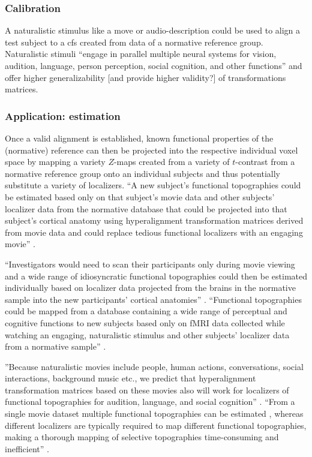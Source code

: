 \subsubsection{Calibration}
%
A naturalistic stimulus like a move or audio-description could be used to align
a test subject to a \ac{cfs} created from data of a normative reference group.
%
Naturalistic stimuli ``engage in parallel multiple neural systems for vision,
audition, language, person perception, social cognition, and other functions''
\citep{jiahui2020predicting} and offer higher generalizability [and provide
higher validity?] of transformations matrices.



\subsubsection{Application: estimation}

%
Once a valid alignment is established, known functional properties of the
(normative) reference can then be projected into the respective individual voxel
space by mapping a variety $Z$-maps created from a variety of $t$-contrast from
a normative reference group onto an individual subjects and thus potentially
substitute a variety of localizers.
%
``A new subject's functional topographies could be estimated based only on that
subject's movie data and other subjects' localizer data from the normative
database that could be projected into that subject's cortical anatomy using
hyperalignment transformation matrices derived from movie data and could replace
tedious functional localizers with an engaging movie''
\citep{jiahui2020predicting}.

%
``Investigators would need to scan their participants only during movie viewing
and a wide range of idiosyncratic functional topographies could then be
estimated individually based on localizer data projected from the brains in the
normative sample into the new participants' cortical anatomies''
\citep{jiahui2020predicting}.
%
``Functional topographies could be mapped from a database containing a wide
range of perceptual and cognitive functions to new subjects based only on fMRI
data collected while watching an engaging, naturalistic stimulus and other
subjects' localizer data from a normative sample'' \citep{jiahui2020predicting}.

%
''Because naturalistic movies include people, human actions, conversations,
social interactions, background music etc., we predict that hyperalignment
transformation matrices based on these movies also will work for localizers of
functional topographies for audition, language, and social cognition''
\citep{jiahui2020predicting}.
%
``From a single movie dataset multiple functional topographies can be estimated
\citep{guntupalli2016model}, whereas different localizers are typically required
to map different functional topographies, making a thorough mapping of selective
topographies time-consuming and inefficient'' \citep{jiahui2020predicting}.



